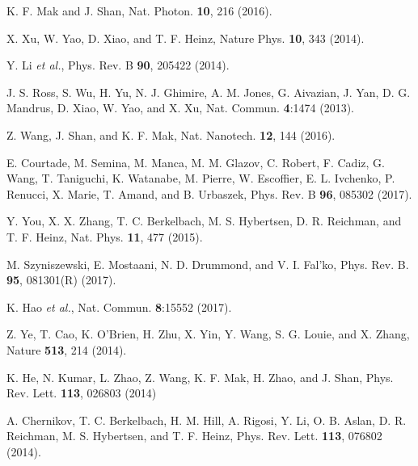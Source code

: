 \documentclass[aps,prl,twocolumn]{revtex4-1}
\begin{document}
\begin{references}

K. F. Mak and J. Shan, Nat. Photon. \textbf{10}, 216 (2016).  %

X. Xu, W. Yao, D. Xiao, and T. F. Heinz, Nature Phys. \textbf{10}, 343 (2014).

Y. Li \emph{et al.}, Phys. Rev. B \textbf{90}, 205422 (2014). %

J. S. Ross, S. Wu, H. Yu, N. J. Ghimire, A. M. Jones, G. Aivazian, J. Yan, D. G. Mandrus, D. Xiao, W. Yao, and X. Xu, Nat. Commun. \textbf{4}:1474 (2013). %

Z. Wang, J. Shan, and K. F. Mak, Nat. Nanotech. \textbf{12}, 144 (2016).

E. Courtade, M. Semina, M. Manca, M. M. Glazov, C. Robert, F. Cadiz, G. Wang, T. Taniguchi, K. Watanabe, M. Pierre, W. Escoffier, E. L. Ivchenko, P. Renucci, X. Marie, T. Amand, and B. Urbaszek, Phys. Rev. B \textbf{96}, 085302 (2017). %

Y. You, X. X. Zhang, T. C. Berkelbach, M. S. Hybertsen, D. R. Reichman, and T. F. Heinz, Nat. Phys. \textbf{11}, 477 (2015). %

M. Szyniszewski, E. Mostaani, N. D. Drummond, and V. I. Fal'ko, Phys. Rev. B. \textbf{95}, 081301(R) (2017). %

K. Hao \emph{et al.}, Nat. Commun. \textbf{8}:15552 (2017). %

Z. Ye, T. Cao, K. O'Brien, H. Zhu, X. Yin, Y. Wang, S. G. Louie, and X. Zhang, Nature \textbf{513}, 214 (2014). %

K. He, N. Kumar, L. Zhao, Z. Wang, K. F. Mak, H. Zhao, and J. Shan, Phys. Rev. Lett. \textbf{113}, 026803 (2014) %

A. Chernikov, T. C. Berkelbach, H. M. Hill, A. Rigosi, Y. Li, O. B. Aslan, D. R. Reichman, M. S. Hybertsen, and T. F. Heinz, Phys. Rev. Lett. \textbf{113}, 076802 (2014).


\end{references}
\end{document}
